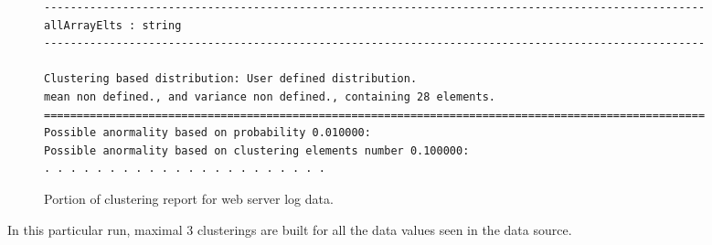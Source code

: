 \begin{figure*}
\begin{small}
\begin{verbatim}
-----------------------------------------------------------------------------------------------------
allArrayElts : string
-----------------------------------------------------------------------------------------------------

Clustering based distribution: User defined distribution. 
mean non defined., and variance non defined., containing 28 elements. 
=====================================================================================================
Possible anormality based on probability 0.010000: 
Possible anormality based on clustering elements number 0.100000: 
. . . . . . . . . . . . . . . . . . . . . . 
\end{verbatim}
\end{small}
\caption{Portion of clustering report for web server log data.}
\label{figure:wsl-cluster-report-1}
\end{figure*}
%
In this particular run, maximal 3 clusterings are built for all the
data values seen in the data source.


